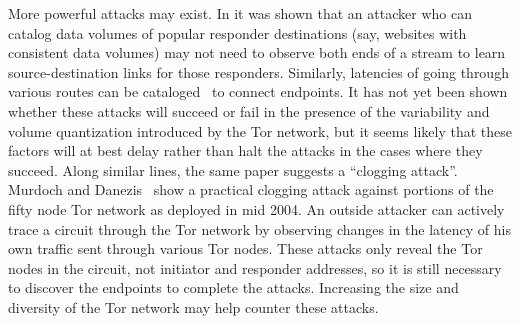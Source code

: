 \documentclass{llncs}
\begin{document}
More powerful attacks may exist. In \cite{hintz-pet02} it was
shown that an attacker who can catalog data volumes of popular
responder destinations (say, websites with consistent data volumes) may not
need to
observe both ends of a stream to learn source-destination links for those
responders.
Similarly, latencies of going through various routes can be
cataloged~\cite{back01} to connect endpoints.
%
It has not yet been shown whether these attacks will succeed or fail
in the presence of the variability and volume quantization introduced by the
Tor network, but it seems likely that these factors will at best delay
rather than halt the attacks in the cases where they succeed.
Along similar lines, the same paper suggests a ``clogging
attack''. Murdoch and Danezis~\cite{attack-tor-oak05} show a practical
clogging attack against portions of
the fifty node Tor network as deployed in mid 2004.
An outside attacker can actively trace a circuit through the Tor network
by observing changes in the latency of his
own traffic sent through various Tor nodes. These attacks only reveal
the Tor nodes in the circuit, not initiator and responder addresses,
so it is still necessary to discover the endpoints to complete the
attacks. Increasing the size and diversity of the Tor network may
help counter these attacks.
\end{document}
